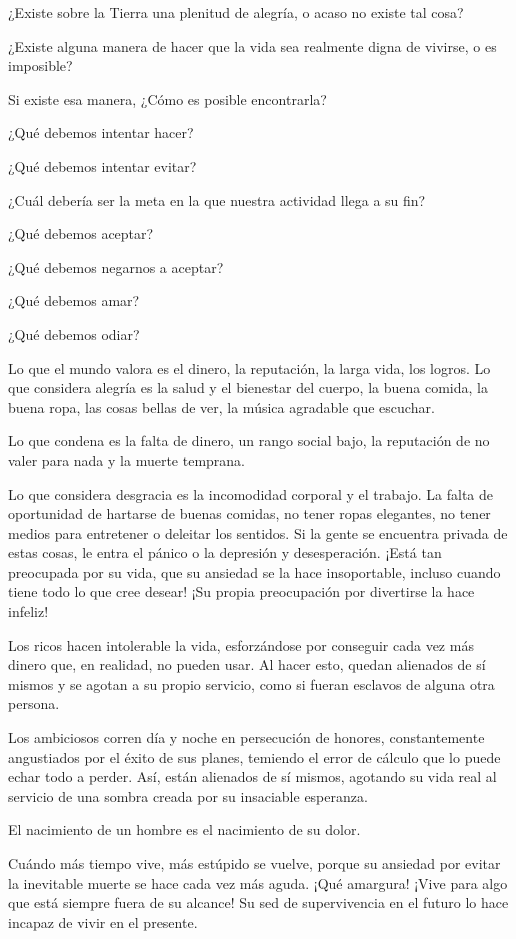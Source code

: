 ¿Existe sobre la Tierra una plenitud de alegría, o acaso no existe tal
cosa?

¿Existe alguna manera de hacer que la vida sea realmente digna de
vivirse, o es imposible?

Si existe esa manera, ¿Cómo es posible encontrarla?

¿Qué debemos intentar hacer?

¿Qué debemos intentar evitar?

¿Cuál debería ser la meta en la que nuestra actividad llega a su fin?

¿Qué debemos aceptar?

¿Qué debemos negarnos a aceptar?

¿Qué debemos amar?

¿Qué debemos odiar?

Lo que el mundo valora es el dinero, la reputación, la larga vida, los
logros. Lo que considera alegría es la salud y el bienestar del cuerpo,
la buena comida, la buena ropa, las cosas bellas de ver, la música
agradable que escuchar.

Lo que condena es la falta de dinero, un rango social bajo, la
reputación de no valer para nada y la muerte temprana.

Lo que considera desgracia es la incomodidad corporal y el trabajo. La
falta de oportunidad de hartarse de buenas comidas, no tener ropas
elegantes, no tener medios para entretener o deleitar los sentidos. Si
la gente se encuentra privada de estas cosas, le entra el pánico o la
depresión y desesperación. ¡Está tan preocupada por su vida, que su
ansiedad se la hace insoportable, incluso cuando tiene todo lo que cree
desear! ¡Su propia preocupación por divertirse la hace infeliz!

Los ricos hacen intolerable la vida, esforzándose por conseguir cada vez
más dinero que, en realidad, no pueden usar. Al hacer esto, quedan
alienados de sí mismos y se agotan a su propio servicio, como si fueran
esclavos de alguna otra persona.

Los ambiciosos corren día y noche en persecución de honores,
constantemente angustiados por el éxito de sus planes, temiendo el error
de cálculo que lo puede echar todo a perder. Así, están alienados de sí
mismos, agotando su vida real al servicio de una sombra creada por su
insaciable esperanza.

El nacimiento de un hombre es el nacimiento de su dolor.

Cuándo más tiempo vive, más estúpido se vuelve, porque su ansiedad por
evitar la inevitable muerte se hace cada vez más aguda. ¡Qué amargura!
¡Vive para algo que está siempre fuera de su alcance! Su sed de
supervivencia en el futuro lo hace incapaz de vivir en el presente.

